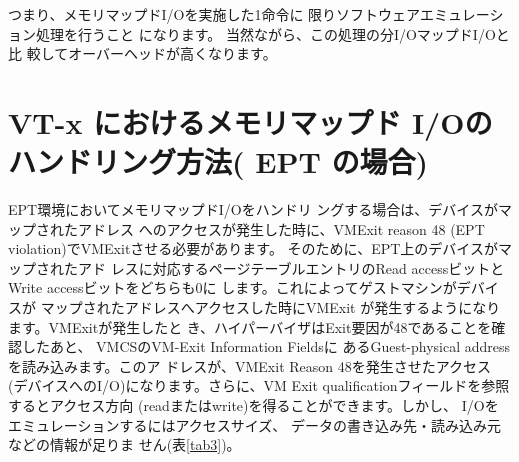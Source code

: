 つまり、メモリマップドI/Oを実施した1命令に
限りソフトウェアエミュレーション処理を行うこと
になります。
 当然ながら、この処理の分I/OマップドI/Oと比
較してオーバーヘッドが高くなります。


\section{VT-x におけるメモリマップド I/Oのハンドリング方法( EPT の場合)}

 EPT環境においてメモリマップドI/Oをハンドリ
ングする場合は、デバイスがマップされたアドレス
へのアクセスが発生した時に、VMExit reason 48
(EPT violation)でVMExitさせる必要があります。
そのために、EPT上のデバイスがマップされたアド
レスに対応するページテーブルエントリのRead
accessビットとWrite accessビットをどちらも0に
します。これによってゲストマシンがデバイスが
マップされたアドレスへアクセスした時にVMExit
が発生するようになります。VMExitが発生したと
き、ハイパーバイザはExit要因が48であることを確
認したあと、 VMCSのVM-Exit Information Fieldsに
あるGuest-physical addressを読み込みます。このア
ドレスが、VMExit Reason 48を発生させたアクセス
(デバイスへのI/O)になります。さらに、VM Exit
qualificationフィールドを参照するとアクセス方向
(readまたはwrite)を得ることができます。しかし、
I/Oをエミュレーションするにはアクセスサイズ、
データの書き込み先・読み込み元などの情報が足りま
せん(表\ref{tab3})。

